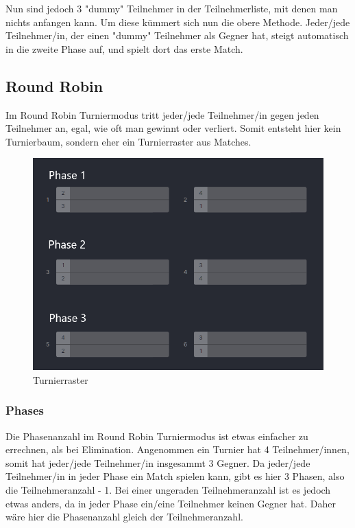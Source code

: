Nun sind jedoch 3 "dummy" Teilnehmer in der Teilnehmerliste, mit denen man nichts anfangen kann. Um diese kümmert sich nun die obere Methode. Jeder/jede Teilnehmer/in, der einen "dummy" Teilnehmer als Gegner hat, 
steigt automatisch in die zweite Phase auf, und spielt dort das erste Match.

\subsection{Round Robin}

Im Round Robin Turniermodus tritt jeder/jede Teilnehmer/in gegen jeden Teilnehmer an, egal, wie oft man gewinnt oder verliert. Somit entsteht hier kein Turnierbaum, sondern eher ein Turnierraster aus Matches.

\begin{figure}[H]
    \includegraphics[scale=0.5]{pics/backend/roundrobin/roundrobin_grid.png}
    \caption{Turnierraster\cite{implementation-execution-1}}
\end{figure}

\subsubsection{Phases}

Die Phasenanzahl im Round Robin Turniermodus ist etwas einfacher zu errechnen, als bei Elimination. Angenommen ein Turnier hat 4 Teilnehmer/innen, somit hat jeder/jede Teilnehmer/in insgesammt 3 Gegner. Da jeder/jede Teilnehmer/in in jeder Phase 
ein Match spielen kann, gibt es hier 3 Phasen, also die Teilnehmeranzahl - 1. Bei einer ungeraden Teilnehmeranzahl ist es jedoch etwas anders, da in jeder Phase ein/eine Teilnehmer keinen Gegner hat. Daher wäre hier die Phasenanzahl gleich 
der Teilnehmeranzahl.

